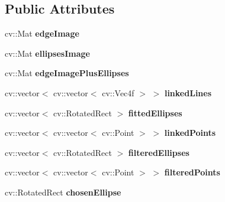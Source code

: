 \subsection*{Public Attributes}
\begin{DoxyCompactItemize}
\item 
\hypertarget{classMyEllipses_a5d00af69849dd1e6ef741605333a579f}{
cv::Mat {\bfseries edgeImage}}
\label{classMyEllipses_a5d00af69849dd1e6ef741605333a579f}

\item 
\hypertarget{classMyEllipses_a229b20b81bda1271ed7af085b482f84a}{
cv::Mat {\bfseries ellipsesImage}}
\label{classMyEllipses_a229b20b81bda1271ed7af085b482f84a}

\item 
\hypertarget{classMyEllipses_a9c6cb1c01422433b73e4e8f801ca1ca4}{
cv::Mat {\bfseries edgeImagePlusEllipses}}
\label{classMyEllipses_a9c6cb1c01422433b73e4e8f801ca1ca4}

\item 
\hypertarget{classMyEllipses_a4711376cc7c9a40d95e5e9e1cf4aae13}{
cv::vector$<$ cv::vector$<$ cv::Vec4f $>$ $>$ {\bfseries linkedLines}}
\label{classMyEllipses_a4711376cc7c9a40d95e5e9e1cf4aae13}

\item 
\hypertarget{classMyEllipses_a37c38bb0d7736ec0e1de6aa0bcf06c2e}{
cv::vector$<$ cv::RotatedRect $>$ {\bfseries fittedEllipses}}
\label{classMyEllipses_a37c38bb0d7736ec0e1de6aa0bcf06c2e}

\item 
\hypertarget{classMyEllipses_a9bb3cf9c6a77592fe5b08e5a7f454ade}{
cv::vector$<$ cv::vector$<$ cv::Point $>$ $>$ {\bfseries linkedPoints}}
\label{classMyEllipses_a9bb3cf9c6a77592fe5b08e5a7f454ade}

\item 
\hypertarget{classMyEllipses_a388a023ca6bd554712729db978d77179}{
cv::vector$<$ cv::RotatedRect $>$ {\bfseries filteredEllipses}}
\label{classMyEllipses_a388a023ca6bd554712729db978d77179}

\item 
\hypertarget{classMyEllipses_a2c6dd2ca86f919f0ff51a44edba915ca}{
cv::vector$<$ cv::vector$<$ cv::Point $>$ $>$ {\bfseries filteredPoints}}
\label{classMyEllipses_a2c6dd2ca86f919f0ff51a44edba915ca}

\item 
\hypertarget{classMyEllipses_a66d782a43dfb9f682ea8a3dcf018f9f5}{
cv::RotatedRect {\bfseries chosenEllipse}}
\label{classMyEllipses_a66d782a43dfb9f682ea8a3dcf018f9f5}

\end{DoxyCompactItemize}


